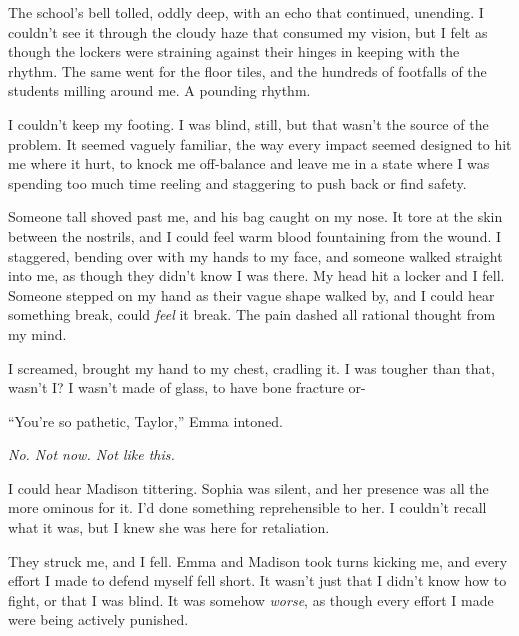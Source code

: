 





The school's bell tolled, oddly deep, with an echo that continued, unending.  I couldn't see it through the cloudy haze that consumed my vision, but I felt as though the lockers were straining against their hinges in keeping with the rhythm.  The same went for the floor tiles, and the hundreds of footfalls of the students milling around me.  A pounding rhythm.



I couldn't keep my footing.  I was blind, still, but that wasn't the source of the problem.  It seemed vaguely familiar, the way every impact seemed designed to hit me where it hurt, to knock me off-balance and leave me in a state where I was spending too much time reeling and staggering to push back or find safety.



Someone tall shoved past me, and his bag caught on my nose.  It tore at the skin between the nostrils, and I could feel warm blood fountaining from the wound.  I staggered, bending over with my hands to my face, and someone walked straight into me, as though they didn't know I was there.  My head hit a locker and I fell.  Someone stepped on my hand as their vague shape walked by, and I could hear something break, could \emph{feel} it break.  The pain dashed all rational thought from my mind.



I screamed, brought my hand to my chest, cradling it.  I was tougher than that, wasn't I?  I wasn't made of glass, to have bone fracture or-



``You're so pathetic, Taylor,'' Emma intoned.



\emph{No.  Not now.  Not like this.}



I could hear Madison tittering.  Sophia was silent, and her presence was all the more ominous for it.  I'd done something reprehensible to her.  I couldn't recall what it was, but I knew she was here for retaliation.



They struck me, and I fell.  Emma and Madison took turns kicking me, and every effort I made to defend myself fell short.  It wasn't just that I didn't know how to fight, or that I was blind.  It was somehow \emph{worse}, as though every effort I made were being actively punished.



